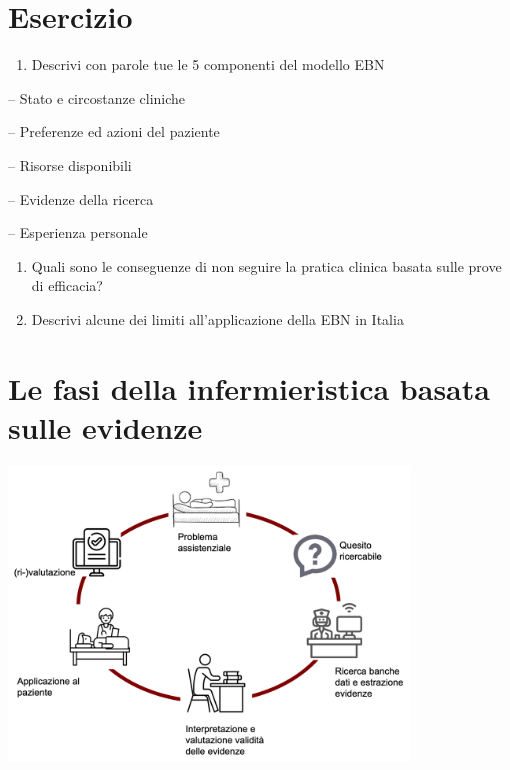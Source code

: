 \documentclass[]{book}
\providecommand{\tightlist}{%
  \setlength{\itemsep}{0pt}\setlength{\parskip}{0pt}}
\begin{document}
\hypertarget{esercizio}{%
\section{Esercizio}\label{esercizio}}

\begin{enumerate}
\def\labelenumi{\arabic{enumi})}
\tightlist
\item
  Descrivi con parole tue le 5 componenti del modello EBN
\end{enumerate}

-- Stato e circostanze cliniche

-- Preferenze ed azioni del paziente

-- Risorse disponibili

-- Evidenze della ricerca

-- Esperienza personale

\begin{enumerate}
\def\labelenumi{\arabic{enumi})}
\setcounter{enumi}{1}
\item
  Quali sono le conseguenze di non seguire la pratica clinica basata sulle prove di efficacia?
\item
  Descrivi alcune dei limiti all'applicazione della EBN in Italia
\end{enumerate}

\hypertarget{le-fasi-della-infermieristica-basata-sulle-evidenze}{%
\section{Le fasi della infermieristica basata sulle evidenze}\label{le-fasi-della-infermieristica-basata-sulle-evidenze}}

\includegraphics[width=0.8\textwidth,height=\textheight]{./img/ebn-ciclo.png}
\end{document}
